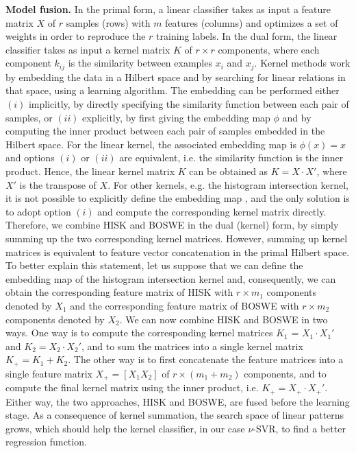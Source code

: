 \documentclass[11pt,a4paper]{article}
\begin{document}
\noindent
{\bf Model fusion.}
In the primal form, a linear classifier takes as input a feature matrix $X$ of $r$ samples (rows) with $m$ features (columns) and optimizes a set of weights in order to reproduce the $r$ training labels. In the dual form, the linear classifier takes as input a kernel matrix $K$ of $r \times r$ components, where each component $k_{ij}$ is the similarity between examples $x_i$ and $x_j$. Kernel methods work by embedding the data in a Hilbert space and by searching for linear relations in that space, using a learning algorithm. The embedding can be performed either $(i)$ implicitly, by directly specifying the similarity function between each pair of samples, or $(ii)$ explicitly, by first giving the embedding map $\phi$ and by computing the inner product between each pair of samples embedded in the Hilbert space. For the linear kernel, the associated embedding map is $\phi(x) = x$ and options $(i)$ or $(ii)$ are equivalent, i.e. the similarity function is the inner product. Hence, the linear kernel matrix $K$ can be obtained as $K = X \cdot X'$, where $X'$ is the transpose of $X$. For other kernels, e.g. the histogram intersection kernel, it is not possible to explicitly define the embedding map  \cite{taylor-Cristianini-cup-2004}, and the only solution is to adopt option $(i)$ and compute the corresponding kernel matrix directly. Therefore, we combine HISK and BOSWE in the dual (kernel) form, by simply summing up the two corresponding kernel matrices. However, summing up kernel matrices is equivalent to feature vector concatenation in the primal Hilbert space. To better explain this statement, let us suppose that we can define the embedding map of the histogram intersection kernel and, consequently, we can obtain the corresponding feature matrix of HISK with $r \times m_1$ components denoted by $X_1$ and the corresponding feature matrix of BOSWE with $r \times m_2$ components denoted by $X_2$. We can now combine HISK and BOSWE in two ways. One way is to compute the corresponding kernel matrices $K_1$ = $X_1 \cdot X_1'$ and $K_2 = X_2 \cdot X_2'$, and to sum the matrices into a single kernel matrix $K_+ = K_1 + K_2$. The other way is to first concatenate the feature matrices into a single feature matrix $X_+ = [X_1 X_2]$ of $r \times (m_1 + m_2)$ components, and to compute the final kernel matrix using the inner product, i.e. $K_+ = X_+ \cdot X_+'$. Either way, the two approaches, HISK and BOSWE, are fused before the learning stage. As a consequence of kernel summation, the search space of linear patterns grows, which should help the kernel classifier, in our case $\nu$-SVR, to find a better regression function.
\end{document}
